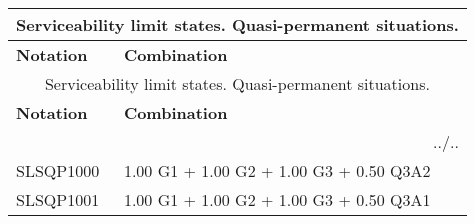 \begin{center}
\begin{small}
\begin{longtable}{|l|p{10cm}|}
\hline
\multicolumn{2}{|c|}{Serviceability limit states. Quasi-permanent situations.}\\
\hline
\textbf{Notation} & \textbf{Combination} \\
\hline
\endfirsthead
\hline
\multicolumn{2}{|c|}{Serviceability limit states. Quasi-permanent situations.}\\
\hline
\textbf{Notation} & \textbf{Combination} \\
\hline
\endhead
\hline \multicolumn{2}{|r|}{{../..}} \\ \hline
\endfoot
\hline
\endlastfoot
SLSQP1000 & 1.00 G1 + 1.00 G2 + 1.00 G3 + 0.50 Q3A2\\
SLSQP1001 & 1.00 G1 + 1.00 G2 + 1.00 G3 + 0.50 Q3A1\\
\hline
\end{longtable}
\end{small}
\end{center}
